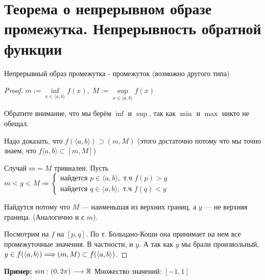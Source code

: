 \section{Теорема о непрерывном образе промежутка. Непрерывность обратной функции \href{https://youtu.be/an3AiCY2hPE?t=279}{\Walley}}
\begin{theorem-non}
    Непрерывный образ промежутка - промежуток (возможно другого типа)

    \begin{proof} \quad

        $m:= \inf\limits_{x \in \langle a, b \rangle}{f(x)}, \; M:= \sup\limits_{x \in \langle a, b \rangle}{f(x)}$

        Обратите внимание, что мы берём $\inf$ и $\sup$, так как $\min$ и $\max$ никто не обещал.

        Надо доказать, что $f (\langle a, b \rangle) \supset (m, M)$ (этого достаточно потому что мы точно знаем, что $f \langle a, b \rangle \subset [m, M]$)

        Случай $m = M$ тривиален. Пусть $m < y < M \Longrightarrow \begin{cases}
            \text{найдется } p \in \langle a, b \rangle, \text{ т.ч } f(p) > y \\
            \text{найдется } q \in \langle a, b \rangle, \text{ т.ч } f(q) < y
        \end{cases}$

        Найдутся потому что $M$ --- наименьшая из верхних границ, а $y$ --- не верхняя граница. (Аналогично и с $m$).

        Посмотрим на $f$ на $[p, q]$. По т. Больцано-Коши она принимает на нем все промежуточные значения.
        В частности, и $y$.
        А так как $y$ мы брали произвольный, $y \in f(\langle a, b \rangle) \Longrightarrow \\
        (m, M) \subset f(\langle a, b \rangle)$.
    \end{proof}
    \textbf{Пример:} $sin: (0, 2\pi) \longrightarrow \mathbb{R}$ \qquad Множество значений: $[-1, 1]$ 
\end{theorem-non}
